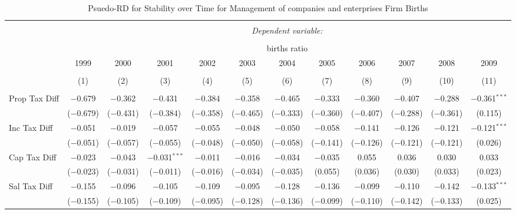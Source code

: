 
\begin{table}[!htbp] \centering 
  \caption{Psuedo-RD for Stability over Time for  Management of companies and enterprises Firm Births} 
  \label{55year} 
\small 
\begin{tabular}{@{\extracolsep{5pt}}lccccccccccc} 
\\[-1.8ex]\hline 
\hline \\[-1.8ex] 
 & \multicolumn{11}{c}{\textit{Dependent variable:}} \\ 
\cline{2-12} 
\\[-1.8ex] & \multicolumn{11}{c}{births ratio} \\ 
 & 1999 & 2000 & 2001 & 2002 & 2003 & 2004 & 2005 & 2006 & 2007 & 2008 & 2009 \\ 
\\[-1.8ex] & (1) & (2) & (3) & (4) & (5) & (6) & (7) & (8) & (9) & (10) & (11)\\ 
\hline \\[-1.8ex] 
 Prop Tax Diff & $-$0.679 & $-$0.362 & $-$0.431 & $-$0.384 & $-$0.358 & $-$0.465 & $-$0.333 & $-$0.360 & $-$0.407 & $-$0.288 & $-$0.361$^{***}$ \\ 
  & ($-$0.679) & ($-$0.431) & ($-$0.384) & ($-$0.358) & ($-$0.465) & ($-$0.333) & ($-$0.360) & ($-$0.407) & ($-$0.288) & ($-$0.361) & (0.115) \\ 
  Inc Tax Diff & $-$0.051 & $-$0.019 & $-$0.057 & $-$0.055 & $-$0.048 & $-$0.050 & $-$0.058 & $-$0.141 & $-$0.126 & $-$0.121 & $-$0.121$^{***}$ \\ 
  & ($-$0.051) & ($-$0.057) & ($-$0.055) & ($-$0.048) & ($-$0.050) & ($-$0.058) & ($-$0.141) & ($-$0.126) & ($-$0.121) & ($-$0.121) & (0.026) \\ 
  Cap Tax Diff & $-$0.023 & $-$0.043 & $-$0.031$^{***}$ & $-$0.011 & $-$0.016 & $-$0.034 & $-$0.035 & 0.055 & 0.036 & 0.030 & 0.033 \\ 
  & ($-$0.023) & ($-$0.031) & ($-$0.011) & ($-$0.016) & ($-$0.034) & ($-$0.035) & (0.055) & (0.036) & (0.030) & (0.033) & (0.023) \\ 
  Sal Tax Diff & $-$0.155 & $-$0.096 & $-$0.105 & $-$0.109 & $-$0.095 & $-$0.128 & $-$0.136 & $-$0.099 & $-$0.110 & $-$0.142 & $-$0.133$^{***}$ \\ 
  & ($-$0.155) & ($-$0.105) & ($-$0.109) & ($-$0.095) & ($-$0.128) & ($-$0.136) & ($-$0.099) & ($-$0.110) & ($-$0.142) & ($-$0.133) & (0.025) \\ 

\end{tabular}
\end{table}
